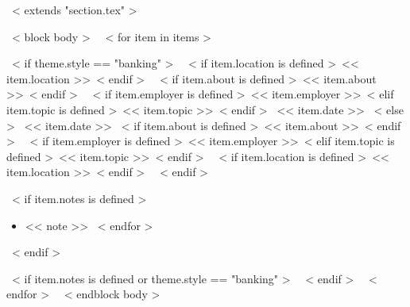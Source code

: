 ~< extends "section.tex" >~

~< block body >~
  ~< for item in items >~
    \begin{samepage}
      \cventry
        ~< if theme.style == "banking" >~
          {~< if item.location is defined >~<< item.location >>~< endif >~}
          {~< if item.about is defined >~<< item.about >>~< endif >~}
          {~< if item.employer is defined >~<< item.employer >>~< elif item.topic is defined >~<< item.topic >>~< endif >~}
          {<< item.date >>}
        ~< else >~
          {<< item.date >>}
          {~< if item.about is defined >~<< item.about >>~< endif >~}
          {~< if item.employer is defined >~<< item.employer >>~< elif item.topic is defined >~<< item.topic >>~< endif >~}
          {~< if item.location is defined >~<< item.location >>~< endif >~}
        ~< endif >~
        {}
        {
          ~< if item.notes is defined >~
            \begin{itemize}
              ~< for note in item.notes >~
                \item{<< note >>}
              ~< endfor >~
            \end{itemize}
          ~< endif >~
        }
    \end{samepage}
    ~< if item.notes is defined or theme.style == "banking" >~
      \vspace{10pt}
    ~< endif >~
  ~< endfor >~
  \vspace{-10pt}
~< endblock body >~
